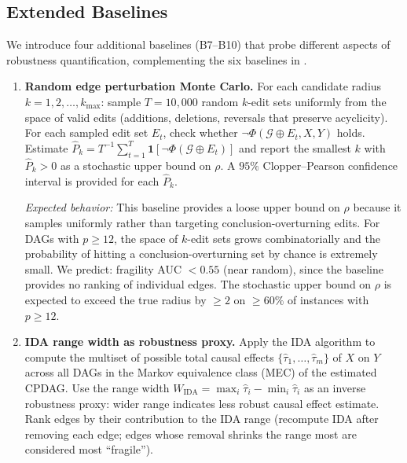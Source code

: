 \documentclass[11pt,a4paper]{article}
\theoremstyle{definition}
\theoremstyle{remark}
\newcommand{\DAG}{\mathcal{G}}
\newcommand{\radius}{\rho}
\newcommand{\Phi}{\varPhi}
\begin{document}
\subsection{Extended Baselines}\label{sec:extended_baselines}

We introduce four additional baselines (B7--B10) that probe different
aspects of robustness quantification, complementing the six baselines
in .

\begin{enumerate}[label=\textbf{B\arabic*:},start=7]
\item \textbf{Random edge perturbation Monte Carlo.} For each candidate
  radius $k = 1, 2, \ldots, k_{\max}$: sample $T = 10{,}000$ random
  $k$-edit sets uniformly from the space of valid edits (additions,
  deletions, reversals that preserve acyclicity). For each sampled edit
  set $E_t$, check whether $\neg\Phi(\DAG \oplus E_t, X, Y)$ holds.
  Estimate $\hat{P}_k = T^{-1}\sum_{t=1}^{T} \mathbf{1}[\neg\Phi(\DAG
  \oplus E_t)]$ and report the smallest $k$ with $\hat{P}_k > 0$ as a
  stochastic upper bound on $\radius$. A $95\%$ Clopper--Pearson
  confidence interval is provided for each $\hat{P}_k$.

  \emph{Expected behavior:} This baseline provides a loose upper bound
  on $\radius$ because it samples uniformly rather than targeting
  conclusion-overturning edits. For DAGs with $p \geq 12$, the space of
  $k$-edit sets grows combinatorially and the probability of hitting a
  conclusion-overturning set by chance is extremely small. We predict:
  fragility AUC $< 0.55$ (near random), since the baseline provides no
  ranking of individual edges. The stochastic upper bound on $\radius$
  is expected to exceed the true radius by $\geq 2$ on $\geq 60\%$ of
  instances with $p \geq 12$.

\item \textbf{IDA range width as robustness proxy.} Apply the IDA
  algorithm \cite{maathuis2009} to compute the multiset of possible
  total causal effects $\{\hat\tau_1, \ldots, \hat\tau_m\}$ of $X$ on
  $Y$ across all DAGs in the Markov equivalence class (MEC) of the
  estimated CPDAG. Use the range width
  $W_{\mathrm{IDA}} = \max_i \hat\tau_i - \min_i \hat\tau_i$
  as an inverse robustness proxy: wider range indicates less robust
  causal effect estimate. Rank edges by their contribution to the IDA
  range (recompute IDA after removing each edge; edges whose removal
  shrinks the range most are considered most ``fragile'').


\end{enumerate}
\end{document}
